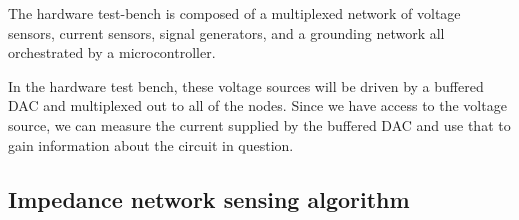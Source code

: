 \documentclass[11pt, a4paper]{article}
\begin{document}
The hardware test-bench is composed of a multiplexed network of voltage sensors, current sensors, signal generators, and a grounding network all orchestrated by a microcontroller.  

In the hardware test bench, these voltage sources will be driven by a buffered DAC and multiplexed out to all of the nodes.
Since we have access to the voltage source, we can measure the current supplied by the buffered DAC and use that to gain information about the circuit in question.




















\subsection{Impedance network sensing algorithm}
\end{document}
